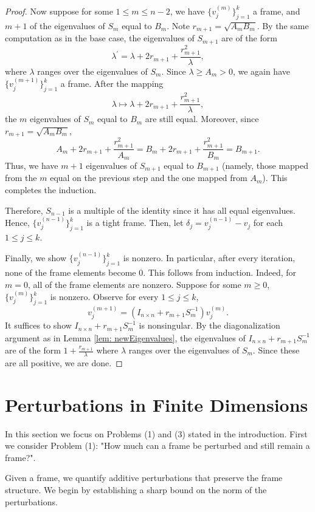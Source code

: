\documentclass[11pt, reqno]{amsart}
\numberwithin{equation}{section}
\begin{document}
\begin{proof}
     Now suppose for some $1\le m\le n-2$, we have $\{v_j^{(m)}\}_{j=1}^k$ a frame, and $m+1$ of the eigenvalues of $S_m$ equal to $B_m$. Note $r_{m+1}=\sqrt{A_mB_m}$. By the same computation as in the base case, the eigenvalues of $S_{m+1}$ are of the form $$\lambda^\prime =\lambda+2r_{m+1}+\frac{r_{m+1}^2}{\lambda},$$ where $\lambda$ ranges over the eigenvalues of $S_m$. Since $\lambda\ge A_m>0$, we again have $\{v_j^{(m+1)}\}_{j=1}^k$ a frame. After the mapping $$\lambda \mapsto \lambda+2r_{m+1}+\frac{r_{m+1}^2}{\lambda},$$ the $m$ eigenvalues of $S_m$ equal to $B_m$ are still equal. Moreover, since $r_{m+1}=\sqrt{A_mB_m}$,  $$A_m+2r_{m+1}+\frac{r_{m+1}^2}{A_m}= B_m+2r_{m+1}+\frac{r_{m+1}^2}{B_m}=B_{m+1}.$$ Thus, we have $m+1$ eigenvalues of $S_{m+1}$ equal to $B_{m+1}$ (namely, those mapped from the $m$ equal on the previous step and the one mapped from $A_m$). This completes the induction.


    Therefore, $S_{n-1}$ is a multiple of the identity since it has all equal eigenvalues. Hence, $\{v_j^{(n-1)}\}_{j=1}^k$ is a tight frame. Then, let $\delta_j= v_j^{(n-1)}-v_j$ for each $1\le j\le k$.

    Finally, we show $\{v_j^{(n-1)}\}_{j=1}^k$ is nonzero. In particular, after every iteration, none of the frame elements become $0$. This follows from induction. Indeed, for $m=0$, all of the frame elements are nonzero. Suppose for some $m\ge 0$, $\{v_j^{(m)}\}_{j=1}^k$ is nonzero. Observe for every $1\le j\le k$,  $$v_j^{(m+1)}= (I_{n\times n}+r_{m+1}S_{m}^{-1})v_{j}^{(m)}.$$ It suffices to show $I_{n\times n}+r_{m+1}S_{m}^{-1}$ is nonsingular. By the diagonalization argument as in Lemma \ref{lem: newEigenvalues}, the eigenvalues of $I_{n\times n}+r_{m+1}S_{m}^{-1}$ are of the form $1+\frac{r_{m+1}}{\lambda}$ where $\lambda$ ranges over the eigenvalues of $S_m$. Since these are all positive, we are done.
\end{proof}



\section{Perturbations in Finite Dimensions }
In this section we focus on Problems (1) and (3) stated  in the introduction. First we consider Problem (1): "How much can a frame be perturbed and still remain a frame?".

Given a frame, we quantify additive perturbations that preserve the frame structure. We begin by establishing a sharp bound on the norm of the perturbations.
\end{document}
